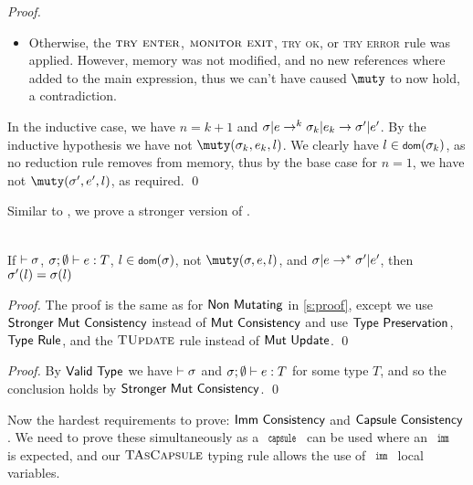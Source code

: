 \begin{proof}
\begin{itemize}
		\item Otherwise, the $\textsc{try enter}$, $\textsc{monitor exit}$, \textsc{try ok}, or \textsc{try error} rule was applied. However, memory was not modified, and no new references
		where added to the main expression, thus we can't have caused $\muty$
		to now hold, a contradiction.
	\end{itemize}
	
	In the inductive case, we have
	$n = k+1$ and $\sigma|e\rightarrow^{k}\sigma_k|e_k\rightarrow\sigma'|e'$. By the inductive hypothesis
	we have not $\muty(\s_k,e_k,l)$. We clearly have $l\in\dom(\s_k)$,
	as no reduction rule removes from memory, thus by the base case for
	$n = 1$, we have not $\muty(\s',e',l)$, as required.
\qed\end{proof}

\LS

Similar to , we prove a stronger version of .

\SS\begin{Corollary}\ \\
	\indent If $\vdash\sigma$, $\tyr eT$, $l\in\dom(\s)$, not $\muty(\s,e,l)$,
	and $\sigma|e\rightarrow^*\sigma'|e'$, then $\sigma'(l) = \sigma(l)$
\end{Corollary}
\SS\begin{proof}
	The proof is the same as for $\textsf{Non Mutating}$ in \autoref{s:proof},
	except we use $\textsf{Stronger Mut Consistency}$ instead of $\textsf{Mut Consistency}$
	and use $\textsf{Type Preservation}$, $\textsf{Type Rule}$, and the
	$\textsc{TUpdate}$ rule instead of $\textsf{Mut Update}$.
\qed\end{proof}

\setcounter{requirement}{2}
\SS\REQMutCons
\SS\begin{proof}
	By $\textsf{Valid Type}$ we have $\vdash\sigma$ and $\tyr eT$ for some
	type $T$, and so the conclusion holds by $\textsf{Stronger Mut Consistency}$.
\qed\end{proof}

\LS

Now the hardest requirements to prove: $\textsf{Imm Consistency}$ and $\textsf{Capsule Consistency}$.
We need to prove these simultaneously as a $\Kw{capsule}$ can be used where an $\Kw{imm}$ is expected, and our $\textsc{TAsCapsule}$ typing rule allows the use of $\Kw{imm}$ local variables.

